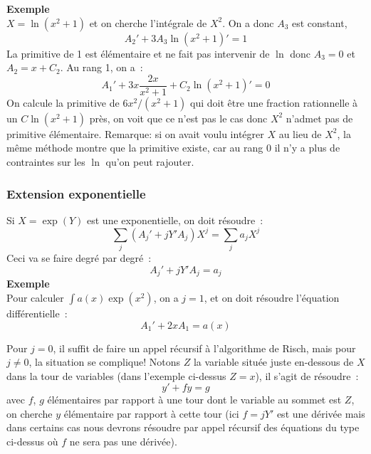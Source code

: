 \documentclass[a4paper,11pt]{article}
\begin{document}
{\bf Exemple}\\
$X=\ln(x^2+1)$ et on cherche l'intégrale de $X^2$. On a donc $A_3$
est constant,
\[ A_2' + 3 A_3 \ln(x^2+1)' = 1\]
La primitive de 1 est élémentaire et ne fait pas intervenir de $\ln$
donc $A_3=0$ et $A_2=x+C_2$. Au rang 1, on a~:
\[A_1' + 3 x \frac{2x}{x^2+1} + C_2 \ln(x^2+1)' = 0\]
On calcule la primitive de $6x^2/(x^2+1)$ qui doit être une fraction
rationnelle à un $C\ln(x^2+1)$ près, on voit que ce n'est pas le cas
donc $X^2$ n'admet pas de primitive élémentaire.
Remarque: si on avait voulu intégrer $X$ au lieu de $X^2$, la même
méthode montre que la primitive existe, car au rang 0 il n'y
a plus de contraintes sur les $\ln$ qu'on peut rajouter.

\subsubsection{Extension exponentielle}
Si $X=\exp(Y)$ est une exponentielle, on doit résoudre~:
\[ \sum_{j} (A_j'+j Y'A_{j}) X^j = \sum_j a_j X^j \]
Ceci va se faire degré par degré~:
\begin{equation} \label{eq:rischdiffeq}
 A_j'+j Y' A_{j} = a_j
\end{equation}
{\bf Exemple}\\
Pour calculer $\int a(x) \exp(x^2)$, on a $j=1$, et on doit résoudre
l'équation différentielle~:
\[ A_1'+2xA_1= a(x)\]

Pour $j=0$, il suffit de faire un appel récursif à l'algorithme de Risch,
mais pour $j\neq 0$, la situation se complique!
Notons $Z$ la variable situ\'ee juste en-dessous de $X$ dans la tour
de variables (dans l'exemple ci-dessus $Z=x$), il s'agit de r\'esoudre~: 
\begin{equation} \label{eq:rischdiffeq2}
y'+f y=g
\end{equation}
avec $f$, $g$ \'el\'ementaires par rapport \`a une tour dont le
variable au sommet est $Z$, on cherche $y$ \'el\'ementaire par rapport
\`a cette tour (ici $f=jY'$ est une d\'eriv\'ee mais dans certains
cas nous devrons r\'esoudre par appel r\'ecursif des \'equations
du type ci-dessus o\`u $f$ ne sera pas une d\'eriv\'ee).
\end{document}
